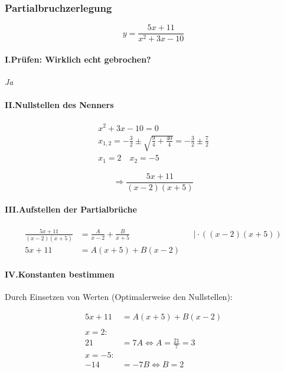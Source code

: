 \subsubsection{Partialbruchzerlegung}

\[
    y = \frac{5x + 11}{x^2 + 3x - 10}    
\]

\paragraph{I.\;Prüfen: Wirklich echt gebrochen?}

\textit{Ja}

\paragraph{II.\;Nullstellen des Nenners}

\begin{gather*}
    x^2 + 3x - 10 = 0 \\
    x_{1,2} = -\frac{3}{2} \pm \sqrt{\frac{9}{4}+ \frac{40}{4}} = -\frac{3}{2} \pm \frac{7}{2} \\
    x_1 = 2 \quad x_2 = -5
\end{gather*}

\[
    \Rightarrow \frac{5x + 11}{(x-2)(x + 5)}
\]

\paragraph{III.\;Aufstellen der Partialbrüche}

\begin{align*}
    \frac{5x + 11}{(x-2)(x + 5)} &= \frac{A}{x - 2} + \frac{B}{x + 5} &&\mid \cdot ((x-2)(x+5)) \\
    5x + 11 &= A(x + 5) + B(x - 2)
\end{align*}

\paragraph{IV.\;Konstanten bestimmen}

Durch Einsetzen von Werten (Optimalerweise den Nullstellen):

\begin{align*}
    5x + 11 &= A(x + 5) + B(x - 2) \\
    \\
    x = 2:\\
    21 &= 7A  \Leftrightarrow A = \frac{21}{7} = 3 \\
    x = -5:\\
    -14 &= -7B \Leftrightarrow B = 2
\end{align*}

